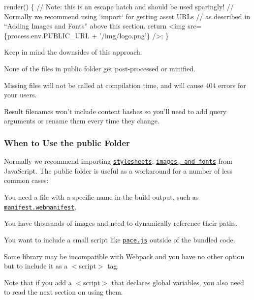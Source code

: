 \begin{DoxyCode}
render() \{
  // Note: this is an escape hatch and should be used sparingly!
  // Normally we recommend using `import` for getting asset URLs
  // as described in “Adding Images and Fonts” above this section.
  return <img src=\{process.env.PUBLIC\_URL + '/img/logo.png'\} />;
\}
\end{DoxyCode}


Keep in mind the downsides of this approach\+:


\begin{DoxyItemize}
\item None of the files in {\ttfamily public} folder get post-\/processed or minified.
\item Missing files will not be called at compilation time, and will cause 404 errors for your users.
\item Result filenames won’t include content hashes so you’ll need to add query arguments or rename them every time they change.
\end{DoxyItemize}

\subsubsection*{When to Use the {\ttfamily public} Folder}

Normally we recommend importing \href{#adding-a-stylesheet}{\tt stylesheets}, \href{#adding-images-fonts-and-files}{\tt images, and fonts} from Java\+Script. The {\ttfamily public} folder is useful as a workaround for a number of less common cases\+:


\begin{DoxyItemize}
\item You need a file with a specific name in the build output, such as \href{https://developer.mozilla.org/en-US/docs/Web/Manifest}{\tt {\ttfamily manifest.\+webmanifest}}.
\item You have thousands of images and need to dynamically reference their paths.
\item You want to include a small script like \href{http://github.hubspot.com/pace/docs/welcome/}{\tt {\ttfamily pace.\+js}} outside of the bundled code.
\item Some library may be incompatible with Webpack and you have no other option but to include it as a {\ttfamily $<$script$>$} tag.
\end{DoxyItemize}

Note that if you add a {\ttfamily $<$script$>$} that declares global variables, you also need to read the next section on using them.

